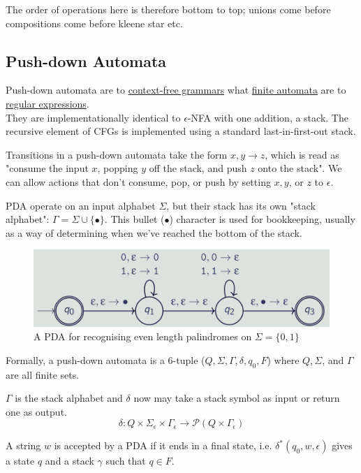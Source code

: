 \documentclass{article}
\begin{document}
The order of operations here is therefore bottom to top; unions come before compositions come before kleene star etc.

\subsection{Push-down Automata}\label{pda}
Push-down automata are to \hyperref[cfg]{context-free grammars} what \hyperref[finite-automata]{finite automata} are to \hyperref[regex]{regular expressions}.\\

They are implementationally identical to  $\epsilon$-NFA with one addition, a stack. The recursive element of CFGs is implemented using a standard last-in-first-out stack.

Transitions in a push-down automata take the form $x, y \to z$, which is read as "consume the input $x$, popping $y$ off the stack, and push $z$ onto the stack". We can allow actions that don't consume, pop, or push by setting $x, y$, or $z$ to $\epsilon$.

PDA operate on an input alphabet $\Sigma$, but their stack has its own "stack alphabet": $\Gamma = \Sigma \cup \{\bullet\}$. This bullet ($\bullet$) character is used for bookkeeping, usually as a way of determining when we've reached the bottom of the stack.


\begin{figure}[H]
    \centering
    \includegraphics[width=0.75\linewidth]{images/pda.png}
    \caption{A PDA for recognising even length palindromes on $\Sigma = \{0, 1\}$}
\end{figure}

Formally, a push-down automata is a 6-tuple ($Q, \Sigma, \Gamma, \delta, q_0, F$) where $Q, \Sigma$, and $\Gamma$ are all finite sets. 

$\Gamma$ is the stack alphabet and $\delta$ now may take a stack symbol as input or return one as output.
\[\delta : Q \times \Sigma_{\epsilon} \times \Gamma_{\epsilon} \to \mathcal{P}(Q \times \Gamma_{\epsilon})\]

A string $w$ is accepted by a PDA if it ends in a final state, i.e. $\delta^*(q_0, w, \epsilon)$ gives a state $q$ and a stack $\gamma$ such that $q \in F$.
\end{document}
